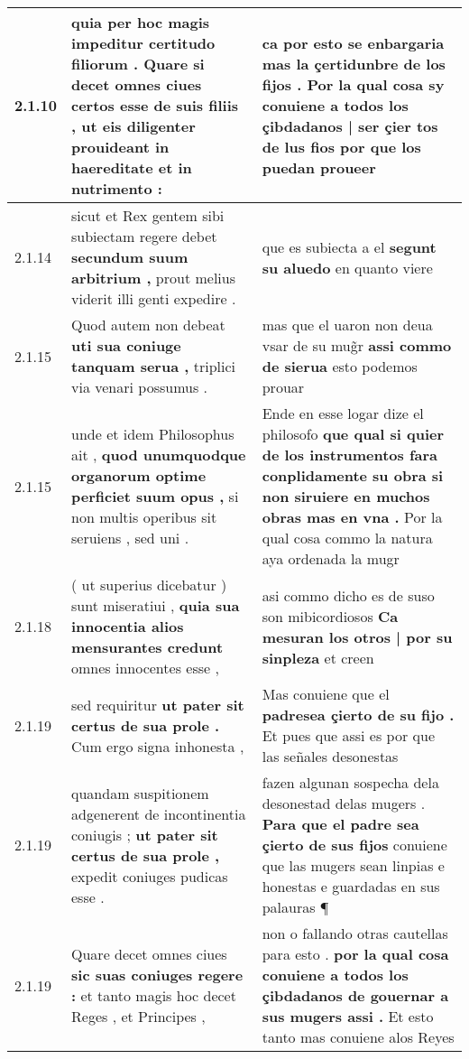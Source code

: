 \begin{tabular}{|p{1cm}|p{6.5cm}|p{6.5cm}|}
2.1.10 & quia per hoc magis impeditur certitudo filiorum . \textbf{ Quare si decet omnes ciues certos esse de suis filiis , } ut eis diligenter prouideant in haereditate et in nutrimento : & ca por esto se enbargaria mas la çertidunbre de los fijos . \textbf{ Por la qual cosa sy conuiene a todos los çibdadanos | ser çier tos de lus fios } por que los puedan proueer \\\hline
2.1.14 & sicut et Rex gentem sibi subiectam regere debet \textbf{ secundum suum arbitrium , } prout melius viderit illi genti expedire . & que es subiecta a el \textbf{ segunt su aluedo } en quanto viere \\\hline
2.1.15 & Quod autem non debeat \textbf{ uti sua coniuge tanquam serua , } triplici via venari possumus . & mas que el uaron non deua vsar de su mug̃r \textbf{ assi commo de sierua } esto podemos prouar \\\hline
2.1.15 & unde et idem Philosophus ait , \textbf{ quod unumquodque organorum optime perficiet suum opus , } si non multis operibus sit seruiens , sed uni . & Ende en esse logar dize el philosofo \textbf{ que qual si quier de los instrumentos fara conplidamente su obra si non siruiere en muchos obras mas en vna . } Por la qual cosa commo la natura aya ordenada la mugr \\\hline
2.1.18 & ( ut superius dicebatur ) sunt miseratiui , \textbf{ quia sua innocentia alios mensurantes credunt } omnes innocentes esse , & asi commo dicho es de suso son mibicordiosos \textbf{ Ca mesuran los otros | por su sinpleza } et creen \\\hline
2.1.19 & sed requiritur \textbf{ ut pater sit certus de sua prole . } Cum ergo signa inhonesta , & Mas conuiene que el \textbf{ padresea çierto de su fijo . } Et pues que assi es por que las señales desonestas \\\hline
2.1.19 & quandam suspitionem adgenerent de incontinentia coniugis ; \textbf{ ut pater sit certus de sua prole , } expedit coniuges pudicas esse . & fazen algunan sospecha dela desonestad delas mugers . \textbf{ Para que el padre sea çierto de sus fijos } conuiene que las mugers sean linpias e honestas e guardadas en sus palauras ¶ \\\hline
2.1.19 & Quare decet omnes ciues \textbf{ sic suas coniuges regere : } et tanto magis hoc decet Reges , et Principes , & non o fallando otras cautellas para esto . \textbf{ por la qual cosa conuiene a todos los çibdadanos de gouernar a sus mugers assi . } Et esto tanto mas conuiene alos Reyes \\\hline

\end{tabular}
